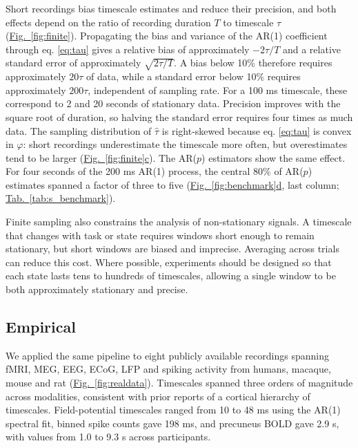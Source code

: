 \documentclass[pdflatex,lineno,sn-nature]{sn-jnl}
\newcommand{\figpanel}[3][]{\hyperref[#2]{Fig.~#1\ref*{#2}#3}}
\newcommand{\tabpanel}[2][]{\hyperref[#2]{Tab.~#1\ref*{#2}}}
\theoremstyle{thmstyleone}
\theoremstyle{thmstyletwo}
\theoremstyle{thmstylethree}
\begin{document}
Short recordings bias timescale estimates and reduce their precision, and both effects depend on the ratio of recording duration $T$ to timescale $\tau$ (\figpanel{fig:finite}{}). Propagating the bias and variance of the AR(1) coefficient \cite{mann_statistical_1943, marriott_bias_1954} through eq. \ref{eq:tau} gives a relative bias of approximately $-2\tau/T$ and a relative standard error of approximately $\sqrt{2\tau/T}$. A bias below 10\% therefore requires approximately $20\tau$ of data, while a standard error below 10\% requires approximately $200\tau$, independent of sampling rate. For a 100 ms timescale, these correspond to 2 and 20 seconds of stationary data. Precision improves with the square root of duration, so halving the standard error requires four times as much data. The sampling distribution of $\hat\tau$ is right-skewed because eq. \ref{eq:tau} is convex in $\varphi$: short recordings underestimate the timescale more often, but overestimates tend to be larger (\figpanel{fig:finite}{c}). The AR($p$) estimators show the same effect. For four seconds of the 200 ms AR(1) process, the central 80\% of AR($p$) estimates spanned a factor of three to five (\figpanel{fig:benchmark}{d}, last column; \tabpanel{tab:s_benchmark}).

Finite sampling also constrains the analysis of non-stationary signals. A timescale that changes with task or state requires windows short enough to remain stationary, but short windows are biased and imprecise. Averaging across trials can reduce this cost. Where possible, experiments should be designed so that each state lasts tens to hundreds of timescales, allowing a single window to be both approximately stationary and precise.

\subsection{Empirical}\label{sec:realdata}

We applied the same pipeline to eight publicly available recordings spanning fMRI, MEG, EEG, ECoG, LFP and spiking activity from humans, macaque, mouse and rat (\figpanel{fig:realdata}{}). Timescales spanned three orders of magnitude across modalities, consistent with prior reports of a cortical hierarchy of timescales. Field-potential timescales ranged from 10 to 48 ms using the AR(1) spectral fit, binned spike counts gave 198 ms, and precuneus BOLD gave 2.9 s, with values from 1.0 to 9.3 s across participants.
\end{document}
